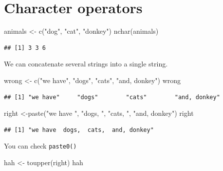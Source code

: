 \documentclass[
]{book}
\newenvironment{Shaded}{\begin{snugshade}}{\end{snugshade}}
\newcommand{\FunctionTok}[1]{\textcolor[rgb]{0.00,0.00,0.00}{#1}}
\newcommand{\NormalTok}[1]{#1}
\newcommand{\OtherTok}[1]{\textcolor[rgb]{0.56,0.35,0.01}{#1}}
\newcommand{\StringTok}[1]{\textcolor[rgb]{0.31,0.60,0.02}{#1}}
\theoremstyle{definition}
\theoremstyle{definition}
\theoremstyle{definition}
\theoremstyle{definition}
\theoremstyle{remark}
\begin{document}
\hypertarget{character-operators}{%
\section{Character operators}\label{character-operators}}

\begin{Shaded}
\begin{Highlighting}[]
\NormalTok{animals }\OtherTok{\textless{}{-}} \FunctionTok{c}\NormalTok{(}\StringTok{"dog"}\NormalTok{, }\StringTok{"cat"}\NormalTok{, }\StringTok{"donkey"}\NormalTok{)}
\FunctionTok{nchar}\NormalTok{(animals)}
\end{Highlighting}
\end{Shaded}

\begin{verbatim}
## [1] 3 3 6
\end{verbatim}

We can concatenate several strings into a single string.

\begin{Shaded}
\begin{Highlighting}[]
\NormalTok{wrong }\OtherTok{\textless{}{-}} \FunctionTok{c}\NormalTok{(}\StringTok{"we have"}\NormalTok{, }\StringTok{"dogs"}\NormalTok{, }\StringTok{"cats"}\NormalTok{, }\StringTok{"and, donkey"}\NormalTok{)}
\NormalTok{wrong}
\end{Highlighting}
\end{Shaded}

\begin{verbatim}
## [1] "we have"     "dogs"        "cats"        "and, donkey"
\end{verbatim}

\begin{Shaded}
\begin{Highlighting}[]
\NormalTok{right }\OtherTok{\textless{}{-}}\FunctionTok{paste}\NormalTok{(}\StringTok{"we have "}\NormalTok{, }\StringTok{"dogs, "}\NormalTok{, }\StringTok{"cats, "}\NormalTok{, }\StringTok{"and, donkey"}\NormalTok{)}
\NormalTok{right}
\end{Highlighting}
\end{Shaded}

\begin{verbatim}
## [1] "we have  dogs,  cats,  and, donkey"
\end{verbatim}

You can check \texttt{paste0()}

\begin{Shaded}
\begin{Highlighting}[]
\NormalTok{hah }\OtherTok{\textless{}{-}} \FunctionTok{toupper}\NormalTok{(right)}
\NormalTok{hah}
\end{Highlighting}
\end{Shaded}
\end{document}
